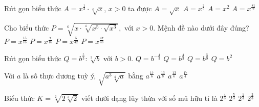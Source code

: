 \begin{ex}%
	Rút gọn biểu thức $A=x^{\tfrac{1}{3}}\cdot \sqrt[6]{x}$,  $x>0$ ta được
	 \choice
		{\True $A=\sqrt{x}$} 
		 {$A=x^{\tfrac{2}{9}}$}
		 {$A=x^2$}
		 {$A=x^{\tfrac{81}{2}}$}
\end{ex}

\begin{ex}%
	Cho biểu thức $P=\sqrt[6]{x\cdot \sqrt[4]{x^5\cdot \sqrt{x^3}}},$ với $x>0$. Mệnh đề nào dưới  đây đúng?
	 \choice
		{$P=x^{\tfrac{15}{16}}$} 
		{\True $P=x^{\tfrac{7}{16}}$} 
		 {$P=x^{\tfrac{5}{42}}$}
		 {$P=x^{\tfrac{47}{48}}$}
\end{ex}

\begin{ex}%
	[Mã 105 2017] Rút  gọn biểu thức $Q=b^{\frac{5}{3}}\colon \sqrt[3]{b}$ với $b>0$.
	\choice 
		 {$Q=b^{-\frac{4}{3}}$}
		{\True  $Q=b^{\frac{4}{3}}$}
		{$Q=b^{\frac{5}{9}}$} 
		{$Q=b^2$} 
\end{ex}

\begin{ex}%
	Với $a$ là số thực dương tuỳ  ý, $\sqrt{a^3\sqrt[4]{a}}$ bằng
	 \choice
		{$a^{\tfrac{17}{6}}$} 
		{\True  $a^{\tfrac{13}{8}}$}
		{$a^{\tfrac{13}{6}}$} 
		 {$a^{\tfrac{17}{4}}$}
\end{ex}

\begin{ex}%
	Biểu thức $K=\sqrt[2]{2\sqrt[3]{2}}$ viết  dưới dạng lũy thừa với số mũ hữu tỉ là
	\choice 
		{$2^{\tfrac{4}{3}}$} 
		 {$2^{\tfrac{5}{3}}$}
		{$2^{\tfrac{1}{3}}$} 
		 {\True $2^{\tfrac{2}{3}}$}
\end{ex}

